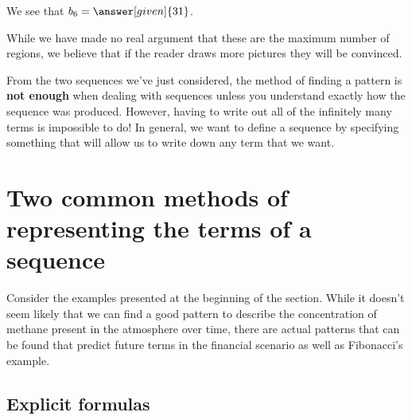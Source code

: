 \documentclass{ximera}
\begin{document}
\begin{example}
\begin{explanation}
\begin{itemize}
 We see that $b_6 = \answer[given]{31}$.
    \end{itemize}
    While we have made no real argument that these are the maximum
    number of regions, we believe that if the reader draws
    more pictures they will be convinced.
  \end{explanation}
\end{example}


From the two sequences we've just considered, the method of finding
a pattern is \textbf{not enough} when dealing with sequences unless
you understand exactly how the sequence was produced.  However, having
to write out all of the infinitely many terms is impossible to do!  In general, we
want to define a sequence by specifying something that will allow us to
write down any term that we want.  


\section{Two common methods of representing the terms of a sequence}

Consider the examples presented at the beginning of the section.  While it doesn't seem likely that we can find a good pattern to describe the concentration of methane present in the atmosphere over time, there are actual patterns that can be found that predict future terms in the financial scenario as well as Fibonacci's example.

\subsection{Explicit formulas}
\end{document}

